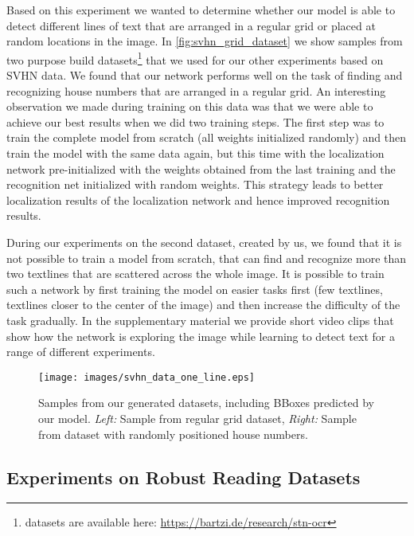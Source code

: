 \documentclass[10pt,twocolumn,letterpaper]{article}
\begin{document}
Based on this experiment we wanted to determine whether our model is able to detect different lines of text that are arranged in a regular grid or placed at random locations in the image.
In \autoref{fig:svhn_grid_dataset} we show samples from two purpose build datasets\footnote{datasets are available here: \url{https://bartzi.de/research/stn-ocr}} that we used for our other experiments based on SVHN data.
We found that our network performs well on the task of finding and recognizing house numbers that are arranged in a regular grid.
An interesting observation we made during training on this data was that we were able to achieve our best results when we did two training steps.
The first step was to train the complete model from scratch (all weights initialized randomly) and then train the model with the same data again, but this time with the localization network pre-initialized with the weights obtained from the last training and the recognition net initialized with random weights.
This strategy leads to better localization results of the localization network and hence improved recognition results.

During our experiments on the second dataset, created by us, we found that it is not possible to train a model from scratch, that can find and recognize more than two textlines that are scattered across the whole image.
It is possible to train such a network by first training the model on easier tasks first (few textlines, textlines closer to the center of the image) and then increase the difficulty of the task gradually.
In the supplementary material we provide short video clips that show how the network is exploring the image while learning to detect text for a range of different experiments.

\begin{figure}[t]
	\begin{center}
		\texttt{[image: images/svhn\_data\_one\_line.eps]}
	\end{center}
	\caption{Samples from our generated datasets, including BBoxes predicted by our model. \textit{Left:} Sample from regular grid dataset, \textit{Right:} Sample from dataset with randomly positioned house numbers.}
	\label{fig:svhn_grid_dataset}
\end{figure}


\subsection{Experiments on Robust Reading Datasets}
\label{ssec:icdar2013_experiments}
\end{document}
